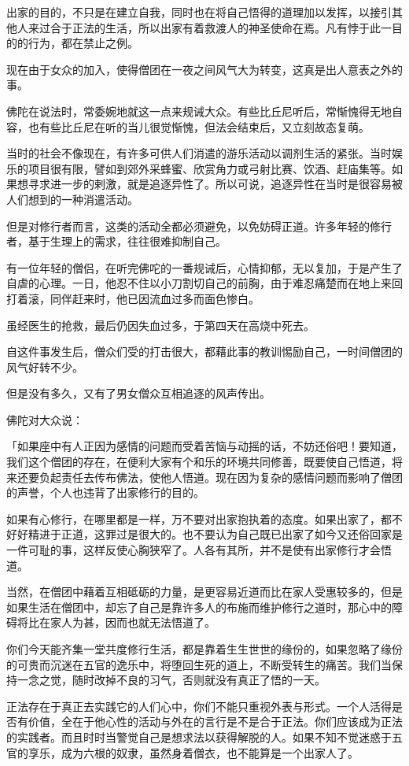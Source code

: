 \documentclass[twoside,openany]{book}
\begin{document}
出家的目的，不只是在建立自我，同时也在将自己悟得的道理加以发挥，以接引其他人来过合于正法的生活，所以出家有着救渡人的神圣使命在焉。凡有悖于此一目的的行为，都在禁止之例。

现在由于女众的加入，使得僧团在一夜之间风气大为转变，这真是出人意表之外的事。

佛陀在说法时，常委婉地就这一点来规诫大众。有些比丘尼听后，常惭愧得无地自容，也有些比丘尼在听的当儿很觉惭愧，但法会结束后，又立刻故态复萌。

当时的社会不像现在，有许多可供人们消遣的游乐活动以调剂生活的紧张。当时娱乐的项目很有限，譬如到郊外采蜂蜜、欣赏角力或弓射比赛、饮酒、赶庙集等。如果想寻求进一步的剌激，就是追逐异性了。所以可说，追逐异性在当时是很容易被人们想到的一种消遣活动。

但是对修行者而言，这类的活动全都必须避免，以免妨碍正道。许多年轻的修行者，基于生理上的需求，往往很难抑制自己。

有一位年轻的僧侣，在听完佛咜的一番规诫后，心情抑郁，无以复加，于是产生了自虐的心理。一日，他忍不住以小刀割切自己的前胸，由于难忍痛楚而在地上来回打着滚，同伴赶来时，他已因流血过多而面色惨白。

虽经医生的抢救，最后仍因失血过多，于第四天在高烧中死去。

自这件事发生后，僧众们受的打击很大，都藉此事的教训惕励自己，一时间僧团的风气好转不少。

但是没有多久，又有了男女僧众互相追逐的风声传出。

佛陀对大众说：

「如果座中有人正因为感情的问题而受着苦恼与动摇的话，不妨还俗吧！要知道，我们这个僧团的存在，在便利大家有个和乐的环境共同修善，既要使自己悟道，将来还要负起责任去传布佛法，使他人悟道。现在因为复杂的感情问题而影响了僧团的声誉，个人也违背了出家修行的目的。

如果有心修行，在哪里都是一样，万不要对出家抱执着的态度。如果出家了，都不好好精进于正道，这罪过是很大的。也不要认为自己既已出家了如今又还俗回家是一件可耻的事，这样反使心胸狭窄了。人各有其所，并不是使有出家修行才会悟道。

当然，在僧团中藉着互相砥砺的力量，是更容易近道而比在家人受惠较多的，但是如果生活在僧团中，却忘了自己是靠许多人的布施而维护修行之道时，那心中的障碍将比在家人为甚，因而也就无法悟道了。

你们今天能齐集一堂共度修行生活，都是靠着生生世世的缘份的，如果忽略了缘份的可贵而沉迷在五官的逸乐中，将堕回生死的道上，不断受转生的痛苦。我们当保持一念之觉，随时改掉不良的习气，否则就没有真正了悟的一天。

正法存在于真正去实践它的人们心中，你们不能只重视外表与形式。一个人活得是否有价值，全在于他心性的活动与外在的言行是不是合于正法。你们应该成为正法的实践者。而且时时当警觉自己是想求法以获得解脱的人。如果不知不觉迷惑于五官的享乐，成为六根的奴隶，虽然身着僧衣，也不能算是一个出家人了。
\end{document}
